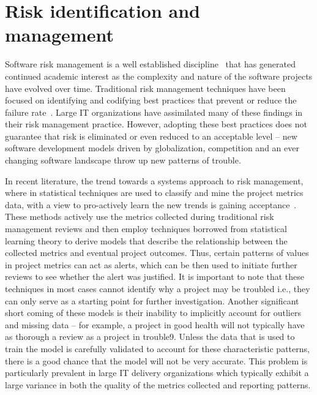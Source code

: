 \section{Risk identification and management}


Software risk management is a well established discipline~\cite{risk1,risk2} that has generated continued academic interest as the complexity and nature of the software projects have evolved over time. Traditional risk management techniques have been focused on identifying and codifying best practices that prevent or reduce the failure rate~\cite{risk3,risk4,risk5,risk6,risk7}. Large IT organizations have assimilated many of these findings in their risk management practice.  However, adopting these best practices does not guarantee that risk is eliminated or even reduced to an acceptable level -- new software development models driven by globalization, competition and an ever changing software landscape throw up new patterns of trouble.

In recent literature, the trend towards a systems approach to risk management, where in statistical techniques are used to classify and mine the project metrics data, with a view to pro-actively learn the new trends is gaining acceptance~\cite{risk8,risk9,risk10}.  These methods actively use the metrics collected during traditional risk management reviews and then employ techniques borrowed from statistical learning theory to derive models that describe the relationship between the collected metrics and eventual project outcomes. Thus, certain patterns of values in project metrics can act as alerts, which can be then used to initiate further reviews to see whether the alert was justified. It is important to note that these techniques in most cases cannot identify why a project may be troubled i.e., they can only serve as a starting point for further investigation.  Another significant short coming of these models is their inability to implicitly account for outliers and missing data -- for example, a project in good health will not typically have as thorough a review as a project in trouble9. Unless the data that is used to train the model is carefully validated to account for these characteristic patterns, there is a good chance that the model will not be very accurate. This problem is particularly prevalent in large IT delivery organizations which typically exhibit a large variance in both the quality of the metrics collected and reporting patterns.

